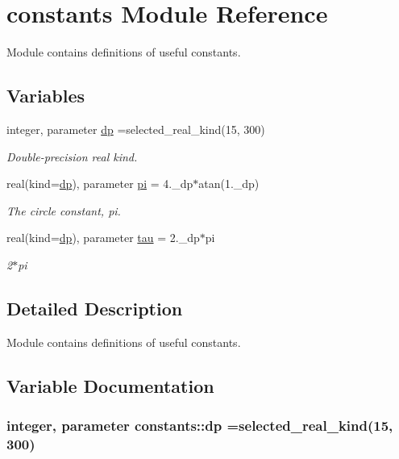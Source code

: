 \hypertarget{namespaceconstants}{}\section{constants Module Reference}
\label{namespaceconstants}


Module contains definitions of useful constants.  


\subsection*{Variables}
\begin{DoxyCompactItemize}
\item 
integer, parameter \hyperlink{namespaceconstants_a1a28a6edcc3cd14a0b8ca99f0a5d4e2c}{dp} =selected\+\_\+real\+\_\+kind(15, 300)
\begin{DoxyCompactList}\small\item\em Double-\/precision real kind. \end{DoxyCompactList}\item 
real(kind=\hyperlink{namespaceconstants_a1a28a6edcc3cd14a0b8ca99f0a5d4e2c}{dp}), parameter \hyperlink{namespaceconstants_a6b3bd07bfab41d9c44a226e58a25abb2}{pi} = 4.\+\_\+dp$\ast$atan(1.\+\_\+dp)
\begin{DoxyCompactList}\small\item\em The circle constant, pi. \end{DoxyCompactList}\item 
real(kind=\hyperlink{namespaceconstants_a1a28a6edcc3cd14a0b8ca99f0a5d4e2c}{dp}), parameter \hyperlink{namespaceconstants_a55d6f125a01979f87b18c4128c21cab3}{tau} = 2.\+\_\+dp$\ast$pi
\begin{DoxyCompactList}\small\item\em 2$\ast$pi \end{DoxyCompactList}\end{DoxyCompactItemize}


\subsection{Detailed Description}
Module contains definitions of useful constants. 

\subsection{Variable Documentation}
\subsubsection[{\texorpdfstring{dp}{dp}}]{\setlength{\rightskip}{0pt plus 5cm}integer, parameter constants\+::dp =selected\+\_\+real\+\_\+kind(15, 300)}\hypertarget{namespaceconstants_a1a28a6edcc3cd14a0b8ca99f0a5d4e2c}{}\label{namespaceconstants_a1a28a6edcc3cd14a0b8ca99f0a5d4e2c}


